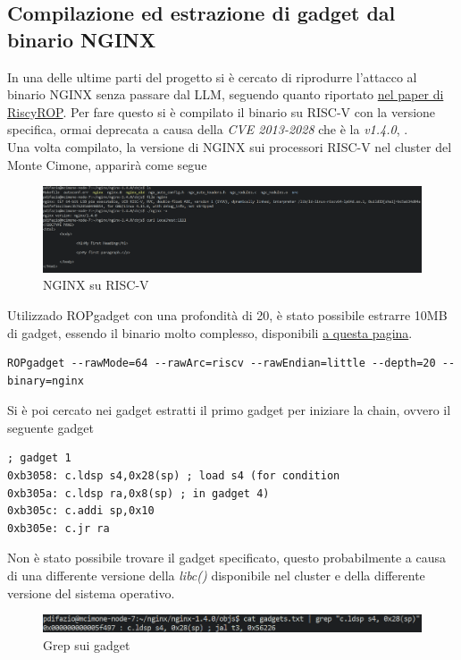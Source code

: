 \subsection*{Compilazione ed estrazione di gadget dal binario NGINX}
In una delle ultime parti del progetto si è cercato di riprodurre l'attacco al binario NGINX senza passare dal LLM, seguendo quanto riportato \href{https://syssec.informatik.uni-due.de/fileadmin/fileupload/I-SYSSEC/research/RiscyROP.pdf}{nel paper di RiscyROP}. Per fare questo si è compilato il binario su RISC-V con la versione specifica, ormai deprecata a causa della \textit{CVE 2013-2028} che è la\textit{ v1.4.0}, \cite{NGINXcve}.\\
Una volta compilato, la versione di NGINX sui processori RISC-V nel cluster del Monte Cimone, apparirà come segue
\FloatBarrier
\vspace{1cm}
\begin{figure}[!htbp]
    \centering
    \includegraphics[width=1\linewidth]{images/nginx.png}
    \caption{NGINX su RISC-V}
\end{figure}
\vspace{1cm}
\FloatBarrier
Utilizzado ROPgadget con una profondità di 20, è stato possibile estrarre 10MB di gadget, essendo il binario molto complesso, disponibili \href{https://github.com/BlessedRebuS/RISCV-Attacks/blob/main/nginx-1.4.0/gadgets.txt}{a questa pagina}.
\begin{verbatim}
ROPgadget --rawMode=64 --rawArc=riscv --rawEndian=little --depth=20 --binary=nginx
\end{verbatim}
Si è poi cercato nei gadget estratti il primo gadget per iniziare la chain, ovvero il seguente gadget
\begin{verbatim}
; gadget 1
0xb3058: c.ldsp s4,0x28(sp) ; load s4 (for condition
0xb305a: c.ldsp ra,0x8(sp) ; in gadget 4)
0xb305c: c.addi sp,0x10
0xb305e: c.jr ra
\end{verbatim}
Non è stato possibile trovare il gadget specificato, questo probabilmente a causa di una differente versione della \textit{libc()} disponibile nel cluster e della differente versione del sistema operativo.
\FloatBarrier
\vspace{1cm}
\begin{figure}[!htbp]
    \centering
    \includegraphics[width=1\linewidth]{images/grep.png}
    \caption{Grep sui gadget}
\end{figure}
\vspace{1cm}
\FloatBarrier
